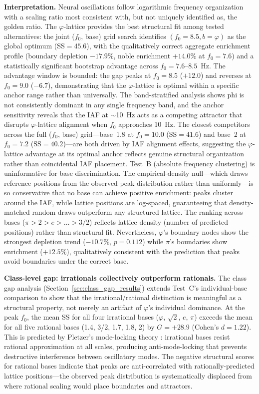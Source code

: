 \documentclass[11pt,a4paper]{article}
\newcommand{\phisym}{\varphi}
\newcommand{\fzero}{f_0}
\begin{document}
\textbf{Interpretation.} Neural oscillations follow logarithmic frequency organization with a scaling ratio most consistent with, but not uniquely identified as, the golden ratio. The $\phisym$-lattice provides the best structural fit among tested alternatives: the joint ($\fzero$, base) grid search identifies $(\fzero = 8.5, b = \phisym)$ as the global optimum ($\text{SS} = 45.6$), with the qualitatively correct aggregate enrichment profile (boundary depletion $-17.9\%$, noble enrichment $+14.0\%$ at $\fzero = 7.6$) and a statistically significant bootstrap advantage across $\fzero = 7.6$--$8.5$~Hz. The advantage window is bounded: the gap peaks at $\fzero = 8.5$ ($+12.0$) and reverses at $\fzero = 9.0$ ($-6.7$), demonstrating that the $\phisym$-lattice is optimal within a specific anchor range rather than universally. The band-stratified analysis shows phi is not consistently dominant in any single frequency band, and the anchor sensitivity reveals that the IAF at $\sim$10~Hz acts as a competing attractor that disrupts $\phisym$-lattice alignment when $\fzero$ approaches 10~Hz. The closest competitors across the full ($\fzero$, base) grid---base~1.8 at $\fzero = 10.0$ ($\text{SS} = 41.6$) and base~2 at $\fzero = 7.2$ ($\text{SS} = 40.2$)---are both driven by IAF alignment effects, suggesting the $\phisym$-lattice advantage at its optimal anchor reflects genuine structural organization rather than coincidental IAF placement.
Test~B (absolute frequency clustering) is uninformative for base discrimination. The empirical-density null---which draws reference positions from the observed peak distribution rather than uniformly---is so conservative that no base can achieve positive enrichment: peaks cluster around the IAF, while lattice positions are log-spaced, guaranteeing that density-matched random draws outperform any structured lattice. The ranking across bases ($\pi > 2 > e > \ldots > 3/2$) reflects lattice density (number of predicted positions) rather than structural fit. Nevertheless, $\phisym$'s boundary nodes show the strongest depletion trend ($-10.7\%$, $p = 0.112$) while $\pi$'s boundaries show enrichment ($+12.5\%$), qualitatively consistent with the prediction that peaks avoid boundaries under the correct base.

\textbf{Class-level gap: irrationals collectively outperform rationals.} The class gap analysis (Section~\ref{sec:class_gap_results}) extends Test~C's individual-base comparison to show that the irrational/rational distinction is meaningful as a structural property, not merely an artifact of $\phisym$'s individual dominance. At the peak $\fzero$, the mean SS for all four irrational bases ($\phisym$, $\sqrt{2}$, $e$, $\pi$) exceeds the mean for all five rational bases (1.4, 3/2, 1.7, 1.8, 2) by $G = +28.9$ (Cohen's $d = 1.22$). This is predicted by Pletzer's mode-locking theory \parencite{pletzer2010golden}: irrational bases resist rational approximation at all scales, producing anti-mode-locking that prevents destructive interference between oscillatory modes. The negative structural scores for rational bases indicate that peaks are anti-correlated with rationally-predicted lattice positions---the observed peak distribution is systematically displaced from where rational scaling would place boundaries and attractors.
\end{document}
